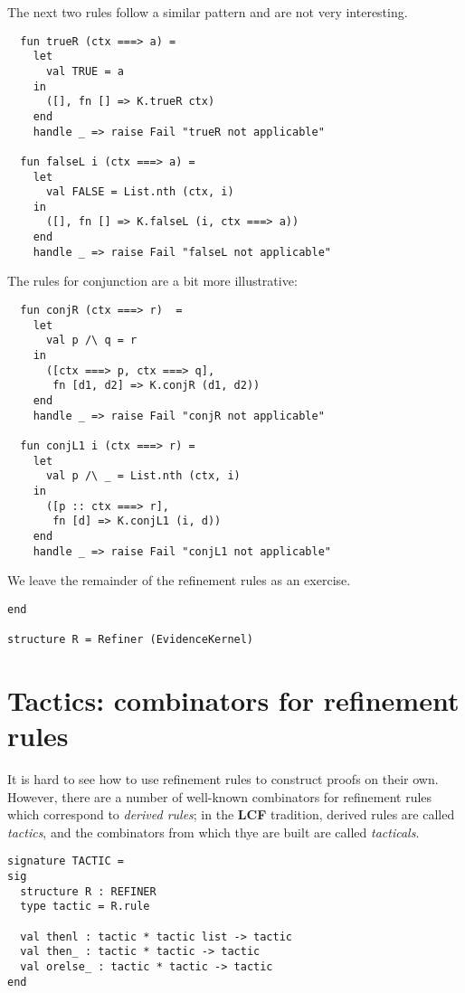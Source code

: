 \documentclass{article}
\newcommand\FormatLang[1]{{\bfseries\sffamily #1}}
\newcommand\LCF{\FormatLang{LCF}}
\theoremstyle{definition}
\theoremstyle{remark}
\begin{document}
The next two rules follow a similar pattern and are not very interesting.
\begin{verbatim}
  fun trueR (ctx ===> a) =
    let
      val TRUE = a
    in
      ([], fn [] => K.trueR ctx)
    end
    handle _ => raise Fail "trueR not applicable"

  fun falseL i (ctx ===> a) =
    let
      val FALSE = List.nth (ctx, i)
    in
      ([], fn [] => K.falseL (i, ctx ===> a))
    end
    handle _ => raise Fail "falseL not applicable"
\end{verbatim}
The rules for conjunction are a bit more illustrative:

\begin{verbatim}
  fun conjR (ctx ===> r)  =
    let
      val p /\ q = r
    in
      ([ctx ===> p, ctx ===> q],
       fn [d1, d2] => K.conjR (d1, d2))
    end
    handle _ => raise Fail "conjR not applicable"

  fun conjL1 i (ctx ===> r) =
    let
      val p /\ _ = List.nth (ctx, i)
    in
      ([p :: ctx ===> r],
       fn [d] => K.conjL1 (i, d))
    end
    handle _ => raise Fail "conjL1 not applicable"
\end{verbatim}

We leave the remainder of the refinement rules as an exercise.
\begin{verbatim}
end

structure R = Refiner (EvidenceKernel)
\end{verbatim}

\section{Tactics: combinators for refinement rules}

It is hard to see how to use refinement rules to construct proofs on
their own. However, there are a number of well-known combinators for
refinement rules which correspond to \emph{derived rules}; in the
\LCF{} tradition, derived rules are called \emph{tactics}, and the
combinators from which thye are built are called \emph{tacticals}.


\begin{verbatim}
signature TACTIC =
sig
  structure R : REFINER
  type tactic = R.rule

  val thenl : tactic * tactic list -> tactic
  val then_ : tactic * tactic -> tactic
  val orelse_ : tactic * tactic -> tactic
end
\end{verbatim}
\end{document}
